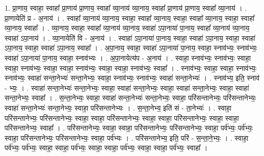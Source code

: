 \documentclass[17pt]{extarticle}
\begin{document}
1. प्रा॒णाय॒ स्वाहा॒ स्वाहा᳚ प्रा॒णाय॑ प्रा॒णाय॒ स्वाहा᳚ व्या॒नाय॑ व्या॒नाय॒ स्वाहा᳚ प्रा॒णाय॑ प्रा॒णाय॒ स्वाहा᳚ व्या॒नाय॑ । . प्रा॒णायेति॑ प्र - अ॒नाय॑ । . स्वाहा᳚ व्या॒नाय॑ व्या॒नाय॒ स्वाहा॒ स्वाहा᳚ व्या॒नाय॒ स्वाहा॒ स्वाहा᳚ व्या॒नाय॒ स्वाहा॒ स्वाहा᳚ व्या॒नाय॒ स्वाहा᳚ । . व्या॒नाय॒ स्वाहा॒ स्वाहा᳚ व्या॒नाय॑ व्या॒नाय॒ स्वाहा॑ ऽपा॒नाया॑ पा॒नाय॒ स्वाहा᳚ व्या॒नाय॑ व्या॒नाय॒ स्वाहा॑ ऽपा॒नाय॑ । . व्या॒नायेति॑ वि - अ॒नाय॑ । . स्वाहा॑ ऽपा॒नाया॑ पा॒नाय॒ स्वाहा॒ स्वाहा॑ ऽपा॒नाय॒ स्वाहा॒ स्वाहा॑ ऽपा॒नाय॒ स्वाहा॒ स्वाहा॑ ऽपा॒नाय॒ स्वाहा᳚ । . अ॒पा॒नाय॒ स्वाहा॒ स्वाहा॑ ऽपा॒नाया॑ पा॒नाय॒ स्वाहा॒ स्नाव॑भ्यः॒ स्नाव॑भ्यः॒ स्वाहा॑ ऽपा॒नाया॑ पा॒नाय॒ स्वाहा॒ स्नाव॑भ्यः । . अ॒पा॒नायेत्य॑प - अ॒नाय॑ । . स्वाहा॒ स्नाव॑भ्यः॒ स्नाव॑भ्यः॒ स्वाहा॒ स्वाहा॒ स्नाव॑भ्यः॒ स्वाहा॒ स्वाहा॒ स्नाव॑भ्यः॒ स्वाहा॒ स्वाहा॒ स्नाव॑भ्यः॒ स्वाहा᳚ । . स्नाव॑भ्यः॒ स्वाहा॒ स्वाहा॒ स्नाव॑भ्यः॒ स्नाव॑भ्यः॒ स्वाहा॑ सन्ता॒नेभ्यः॑ सन्ता॒नेभ्यः॒ स्वाहा॒ स्नाव॑भ्यः॒ स्नाव॑भ्यः॒ स्वाहा॑ सन्ता॒नेभ्यः॑ । . स्नाव॑भ्य॒ इति॒ स्नाव॑ - भ्यः॒ । . स्वाहा॑ सन्ता॒नेभ्यः॑ सन्ता॒नेभ्यः॒ स्वाहा॒ स्वाहा॑ सन्ता॒नेभ्यः॒ स्वाहा॒ स्वाहा॑ सन्ता॒नेभ्यः॒ स्वाहा॒ स्वाहा॑ सन्ता॒नेभ्यः॒ स्वाहा᳚ । . स॒न्ता॒नेभ्यः॒ स्वाहा॒ स्वाहा॑ सन्ता॒नेभ्यः॑ सन्ता॒नेभ्यः॒ स्वाहा॒ परि॑सन्तानेभ्यः॒ परि॑सन्तानेभ्यः॒ स्वाहा॑ सन्ता॒नेभ्यः॑ सन्ता॒नेभ्यः॒ स्वाहा॒ परि॑सन्तानेभ्यः । . स॒न्ता॒नेभ्य॒ इति॑ सं - ता॒नेभ्यः॑ । . स्वाहा॒ परि॑सन्तानेभ्यः॒ परि॑सन्तानेभ्यः॒ स्वाहा॒ स्वाहा॒ परि॑सन्तानेभ्यः॒ स्वाहा॒ स्वाहा॒ परि॑सन्तानेभ्यः॒ स्वाहा॒ स्वाहा॒ परि॑सन्तानेभ्यः॒ स्वाहा᳚ । . परि॑सन्तानेभ्यः॒ स्वाहा॒ स्वाहा॒ परि॑सन्तानेभ्यः॒ परि॑सन्तानेभ्यः॒ स्वाहा॒ पर्व॑भ्यः॒ पर्व॑भ्यः॒ स्वाहा॒ परि॑सन्तानेभ्यः॒ परि॑सन्तानेभ्यः॒ स्वाहा॒ पर्व॑भ्यः । . परि॑सन्तानेभ्य॒ इति॒ परि॑ - स॒न्ता॒ने॒भ्यः॒ । . स्वाहा॒ पर्व॑भ्यः॒ पर्व॑भ्यः॒ स्वाहा॒ स्वाहा॒ पर्व॑भ्यः॒ स्वाहा॒ स्वाहा॒ पर्व॑भ्यः॒ स्वाहा॒ स्वाहा॒ पर्व॑भ्यः॒ स्वाहा᳚ । \newline
\end{document}
